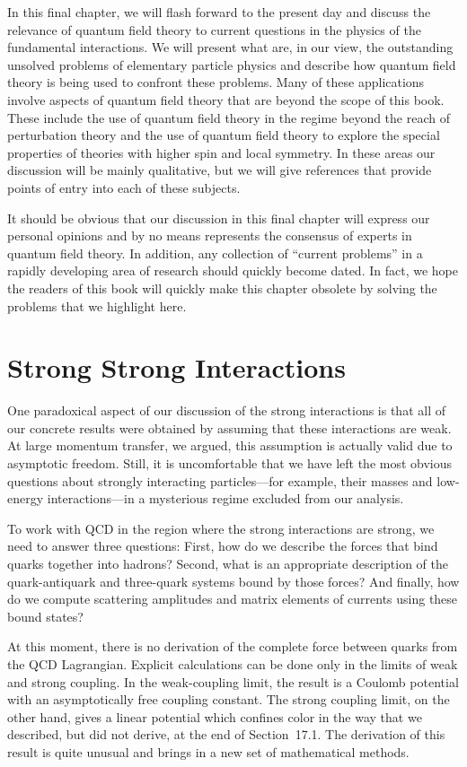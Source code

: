In this final chapter, we will flash forward to the present day and discuss
the relevance of quantum field theory to current questions in the physics of
the fundamental interactions.  We will present what are, in our view, the
outstanding unsolved problems of elementary particle physics and describe how
quantum field theory is being used to confront these problems.  Many of these
applications involve aspects of quantum field theory that are beyond the
scope of this book.  These include the use of quantum field theory in the
regime beyond the reach of perturbation theory and the use of quantum field
theory to explore the special properties of theories with higher spin and
local symmetry.  In these areas our discussion will be mainly qualitative, but
we will give references that provide points of entry into each of these
subjects.

It should be obvious that our discussion in this final chapter will express
our personal opinions and by no means represents the consensus of experts in
quantum field theory.  In addition, any collection of ``current problems'' in
a rapidly developing area of research should quickly become dated.  In fact,
we hope the readers of this book will quickly make this chapter obsolete by
solving the problems that we highlight here.

\section{Strong Strong Interactions}

One paradoxical aspect of our discussion of the strong interactions is that
all of our concrete results were obtained by assuming that these
interactions are weak.  At large momentum transfer, we argued, this
assumption is actually valid due to asymptotic freedom.  Still, it is
uncomfortable that we have left the most obvious questions about strongly
interacting particles---for example, their masses and low-energy
interactions---in a mysterious regime excluded from our analysis.

To work with QCD in the region where the strong interactions are strong, we
need to answer three questions: First, how do we describe the forces that
bind quarks together into hadrons?  Second, what is an appropriate
description of the quark-antiquark and three-quark systems bound by those
forces?  And finally, how do we compute scattering amplitudes and matrix
elements of currents using these bound states?

At this moment, there is no derivation of the complete force between quarks
from the QCD Lagrangian.  Explicit calculations can be done only in the
limits of weak and strong coupling.  In the weak-coupling limit, the result
is a Coulomb potential with an asymptotically free coupling constant.  The
strong coupling limit, on the other hand, gives a linear potential which
confines color in the way that we described, but did not derive, at the end
of Section~17.1.  The derivation of this result is quite unusual and brings
in a new set of mathematical methods.

